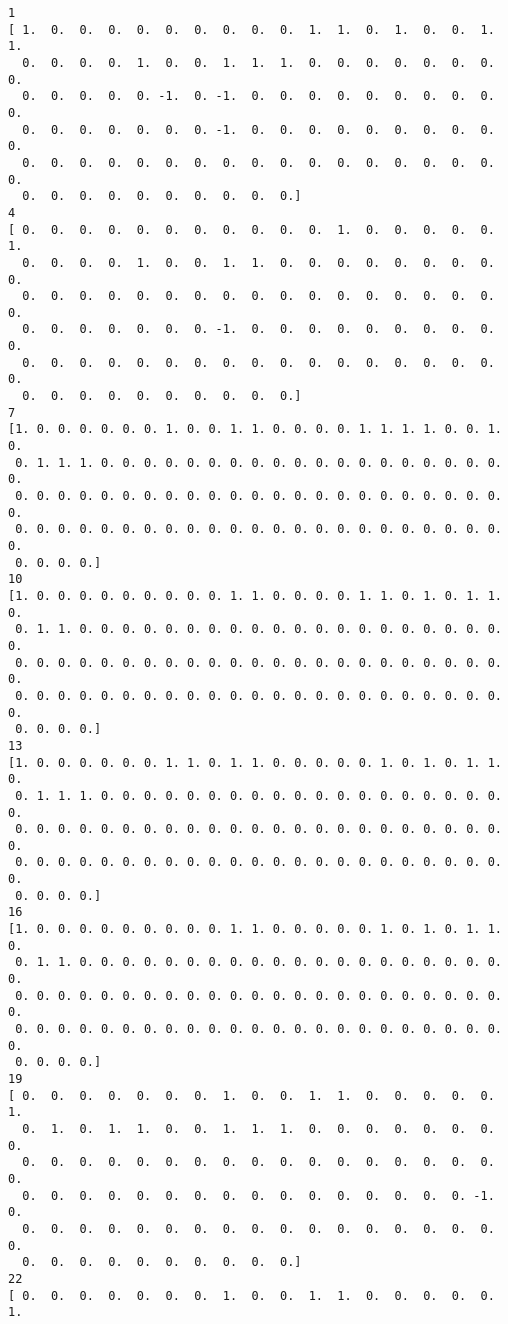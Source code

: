 \documentclass[11pt]{article}
\begin{document}
    \begin{Verbatim}[commandchars=\\\{\}]
1
[ 1.  0.  0.  0.  0.  0.  0.  0.  0.  0.  1.  1.  0.  1.  0.  0.  1.  1.
  0.  0.  0.  0.  1.  0.  0.  1.  1.  1.  0.  0.  0.  0.  0.  0.  0.  0.
  0.  0.  0.  0.  0. -1.  0. -1.  0.  0.  0.  0.  0.  0.  0.  0.  0.  0.
  0.  0.  0.  0.  0.  0.  0. -1.  0.  0.  0.  0.  0.  0.  0.  0.  0.  0.
  0.  0.  0.  0.  0.  0.  0.  0.  0.  0.  0.  0.  0.  0.  0.  0.  0.  0.
  0.  0.  0.  0.  0.  0.  0.  0.  0.  0.]
4
[ 0.  0.  0.  0.  0.  0.  0.  0.  0.  0.  0.  1.  0.  0.  0.  0.  0.  1.
  0.  0.  0.  0.  1.  0.  0.  1.  1.  0.  0.  0.  0.  0.  0.  0.  0.  0.
  0.  0.  0.  0.  0.  0.  0.  0.  0.  0.  0.  0.  0.  0.  0.  0.  0.  0.
  0.  0.  0.  0.  0.  0.  0. -1.  0.  0.  0.  0.  0.  0.  0.  0.  0.  0.
  0.  0.  0.  0.  0.  0.  0.  0.  0.  0.  0.  0.  0.  0.  0.  0.  0.  0.
  0.  0.  0.  0.  0.  0.  0.  0.  0.  0.]
7
[1. 0. 0. 0. 0. 0. 0. 1. 0. 0. 1. 1. 0. 0. 0. 0. 1. 1. 1. 1. 0. 0. 1. 0.
 0. 1. 1. 1. 0. 0. 0. 0. 0. 0. 0. 0. 0. 0. 0. 0. 0. 0. 0. 0. 0. 0. 0. 0.
 0. 0. 0. 0. 0. 0. 0. 0. 0. 0. 0. 0. 0. 0. 0. 0. 0. 0. 0. 0. 0. 0. 0. 0.
 0. 0. 0. 0. 0. 0. 0. 0. 0. 0. 0. 0. 0. 0. 0. 0. 0. 0. 0. 0. 0. 0. 0. 0.
 0. 0. 0. 0.]
10
[1. 0. 0. 0. 0. 0. 0. 0. 0. 0. 1. 1. 0. 0. 0. 0. 1. 1. 0. 1. 0. 1. 1. 0.
 0. 1. 1. 0. 0. 0. 0. 0. 0. 0. 0. 0. 0. 0. 0. 0. 0. 0. 0. 0. 0. 0. 0. 0.
 0. 0. 0. 0. 0. 0. 0. 0. 0. 0. 0. 0. 0. 0. 0. 0. 0. 0. 0. 0. 0. 0. 0. 0.
 0. 0. 0. 0. 0. 0. 0. 0. 0. 0. 0. 0. 0. 0. 0. 0. 0. 0. 0. 0. 0. 0. 0. 0.
 0. 0. 0. 0.]
13
[1. 0. 0. 0. 0. 0. 0. 1. 1. 0. 1. 1. 0. 0. 0. 0. 0. 1. 0. 1. 0. 1. 1. 0.
 0. 1. 1. 1. 0. 0. 0. 0. 0. 0. 0. 0. 0. 0. 0. 0. 0. 0. 0. 0. 0. 0. 0. 0.
 0. 0. 0. 0. 0. 0. 0. 0. 0. 0. 0. 0. 0. 0. 0. 0. 0. 0. 0. 0. 0. 0. 0. 0.
 0. 0. 0. 0. 0. 0. 0. 0. 0. 0. 0. 0. 0. 0. 0. 0. 0. 0. 0. 0. 0. 0. 0. 0.
 0. 0. 0. 0.]
16
[1. 0. 0. 0. 0. 0. 0. 0. 0. 0. 1. 1. 0. 0. 0. 0. 0. 1. 0. 1. 0. 1. 1. 0.
 0. 1. 1. 0. 0. 0. 0. 0. 0. 0. 0. 0. 0. 0. 0. 0. 0. 0. 0. 0. 0. 0. 0. 0.
 0. 0. 0. 0. 0. 0. 0. 0. 0. 0. 0. 0. 0. 0. 0. 0. 0. 0. 0. 0. 0. 0. 0. 0.
 0. 0. 0. 0. 0. 0. 0. 0. 0. 0. 0. 0. 0. 0. 0. 0. 0. 0. 0. 0. 0. 0. 0. 0.
 0. 0. 0. 0.]
19
[ 0.  0.  0.  0.  0.  0.  0.  1.  0.  0.  1.  1.  0.  0.  0.  0.  0.  1.
  0.  1.  0.  1.  1.  0.  0.  1.  1.  1.  0.  0.  0.  0.  0.  0.  0.  0.
  0.  0.  0.  0.  0.  0.  0.  0.  0.  0.  0.  0.  0.  0.  0.  0.  0.  0.
  0.  0.  0.  0.  0.  0.  0.  0.  0.  0.  0.  0.  0.  0.  0.  0. -1.  0.
  0.  0.  0.  0.  0.  0.  0.  0.  0.  0.  0.  0.  0.  0.  0.  0.  0.  0.
  0.  0.  0.  0.  0.  0.  0.  0.  0.  0.]
22
[ 0.  0.  0.  0.  0.  0.  0.  1.  0.  0.  1.  1.  0.  0.  0.  0.  0.  1.

\end{Verbatim}
\end{document}
